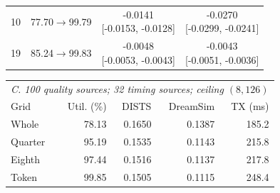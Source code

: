 \begin{table}[t]
\begin{tabular}{@{}lccc@{}}
10 & 77.70$\to$99.79 & \shortstack{-0.0141\\{}[-0.0153, -0.0128]} & \shortstack{-0.0270\\{}[-0.0299, -0.0241]}\\[2pt]
19 & 85.24$\to$99.83 & \shortstack{-0.0048\\{}[-0.0053, -0.0043]} & \shortstack{-0.0043\\{}[-0.0051, -0.0036]}\\[2pt]
\bottomrule\end{tabular}
\par\smallskip
\begin{tabular}{@{}lrrrr@{}}\toprule
\multicolumn{5}{l}{\textit{C. 100 quality sources; 32 timing sources; ceiling $(8,126)$}}\\
Grid & Util. (\%) & DISTS & DreamSim & TX (ms)\\\midrule
Whole & 78.13 & 0.1650 & 0.1387 & 185.2\\
Quarter & 95.19 & 0.1535 & 0.1143 & 215.8\\
Eighth & 97.44 & 0.1516 & 0.1137 & 217.8\\
Token & 99.85 & 0.1505 & 0.1115 & 248.4\\
\bottomrule\end{tabular}
\end{table}

